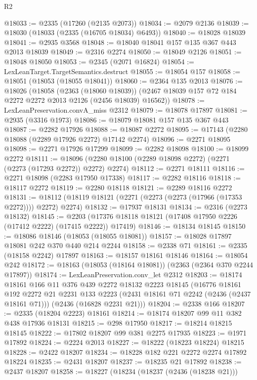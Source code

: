 \begin{lexlean}{R2}
\begin{coremodule}
@18033 := @2335 (@17260 (@2135 @2073))
@18034 := @2079 @2136
@18039 := @18030 (@18033 (@2335 (@16705 @18034) @6493))
@18040 := @18028 @18039
@18041 := @2935 @3568
@18048 := @18040 @18041 @157 @135 @367 @443 @2013 @18039
@18049 := @2316 @2274
@18050 := @18049 @2126
@18051 := @18048 @18050
@18053 := @2345 (@2071 @16824)
@18054 := LexLeanTarget.TargetSemantics.destruct
@18055 := @18054 @157
@18058 := @18051 (@18053 (@18055 @18041))
@18060 := @2364 @135 @2013
@18076 := @18026
    (@18058
      (@2363 (@18060 @18039))
      (@2467 @18039 @157 @72 @184 @2272 @2272 @2013 @2126 (@2456 @18039) @16562))
@18078 := LexLeanPreservation.convA_miss @2312
@18079 := @18078 @17897
@18081 := @2935 (@3316 @1973)
@18086 := @18079 @18081 @157 @135 @367 @443
@18087 := @2282 @17926
@18088 := @18087 @2272
@18095 := @17143 (@2280 @18088 (@2289 @17926 @2272) @17142 @2274)
@18096 := @2271 @18095
@18098 := @2271 @17926 @17299
@18099 := @2282 @18098
@18100 := @18099 @2272
@18111 := @18096 (@2280 @18100 (@2289 @18098 @2272) (@2271 (@2273 (@17293 @2272)) @2272) @2274)
@18112 := @2271 @18111
@18116 := @2271 @18098 (@2283 @17950 @17338)
@18117 := @2282 @18116
@18118 := @18117 @2272
@18119 := @2280 @18118
@18121 := @2289 @18116 @2272
@18131 := @18112 (@18119 @18121 (@2271 (@2273 (@2273 (@17966 (@17353 @2272)))) @2272) @2274)
@18132 := @17937 @18131
@18134 := @2316 (@2273 @18132)
@18145 := @2203 (@17376 @18118 @18121 (@17408 @17950 @2226 (@17412 @2222) (@17415 @2222)) @17419)
@18146 := @18134 @18145
@18150 := @18086 @18146 (@18053 (@18055 @18081))
@18157 := @18028 @17897 @18081 @242 @370 @440 @214 @2244
@18158 := @2338 @71
@18161 := @2335 (@18158 @2242) @17897
@18163 := @18157 @18161 @18146
@18164 := @18054 @242
@18172 := @18163 (@18053 (@18164 @18081)) (@2363 (@2364 @370 @2244 @17897))
@18174 := LexLeanPreservation.conv_let @2312
@18203 := @18174
    @18161
    @166
    @11
    @376
    @439
    @2272
    @18132
    @2223
    @18145
    (@16776
      @18161
      @192
      @2272
      @21
      @2231
      @133
      @2223
      (@2431 @18161 @71 @2242 (@2436 (@2437 @18161 @71)))
      (@2436 (@16828 @2231 @21)))
@18204 := @2338 @166
@18207 := @2335 (@18204 @2223) @18161
@18214 := @18174 @18207 @99 @11 @382 @438 @17936 @18131
@18215 := @298 @17950
@18217 := @18214 @18215 @18145
@18222 := @17802 @18207 @99 @381 @2275 @17935
@18223 := @1971 @17892
@18224 := @2224 @2013
@18227 := @18222 (@18223 @18224) @18215
@18228 := @2422 @18207
@18234 := @18228 @182 @221 @2272 @2274 @17892 @18224
@18235 := @2431 @18207
@18237 := @18235 @21 @17892
@18238 := @2437 @18207
@18258 := @18227
    (@18234
      (@18237 (@2436 (@18238 @21)))

\end{coremodule}
\end{lexlean}
